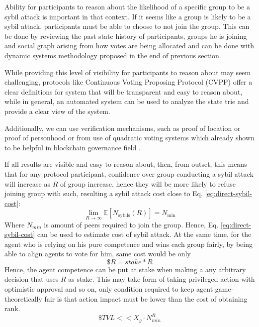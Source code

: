 \documentclass{article}
\begin{document}
\begin{CJK}{UTF8}{gbsn}
    Ability for participants to reason about the likelihood of a specific group to be a sybil attack is important in that context. If it seems like a group is likely to be a sybil attack, participants must be able to choose to not join the group. This can be done by reviewing the past state history of participants, groups he is joining and social graph arising from how votes are being allocated and can be done with dynamic systems methodology proposed in the end of previous section.

    While providing this level of visibility for participants to reason about may seem challenging, protocols like Continuous Voting Proposing Protocol (CVPP) \cite{cvpp} offer a clear definitions for system that will be transparent and easy to reason about, while in general, an automated system can be used to analyze the state trie and provide a clear view of the system.

    Additionally, we can use verification mechanisms, such as proof of location \cite{sheng2024bftpolocbyzantinefortifiedtrigonometric} or proof of personhood \cite{WorldCoin2024} or from use of quadratic voting systems which already shown to be helpful in blockchain governance field \cite{Buterin20}\cite{Benhaim2024}.

    If all results are visible and easy to reason about, then, from outset, this means that for any protocol participant, confidence over group conducting a sybil attack will increase as $R$ of group increase, hence they will be more likely to refuse joining group with such, resulting a sybil attack cost close to Eq. \ref{eq:direct-sybil-cost}:
    \begin{equation}
        \lim_{R \to \infty} \mathbb{E}[N_{\text{sybils}}(R)] = N_{\text{min}}
        \label{eq:limit-nmin}
    \end{equation} Where $N_{min}$ is amount of peers required to join the group. Hence, Eq. \ref{eq:direct-sybil-cost} can be used to estimate cost of sybil attack. At the same time, for the agent who is relying on his pure competence and wins each group fairly, by being able to align agents to vote for him, same cost would be only \begin{equation}
        \$R = stake*R
    \end{equation}
    Hence, the agent competence can be put at stake when making a any arbitrary decision that uses $R$ as stake. This may take form of taking privileged action with optimistic approval and so on, only condition required to keep agent game-theoretically fair is that action impact must be lower than the cost of obtaining rank.
    \begin{equation}
        \$TVL <<  X_g \cdot N_{min}^R
    \end{equation}


\end{CJK}
\end{document}
